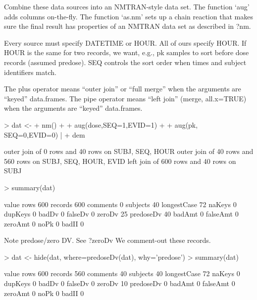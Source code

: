 Combine these data sources into an NMTRAN-style data set.
The function `aug' adds columns on-the-fly.
The function `as.nm' sets up a chain reaction that makes sure the
final result has properties of an NMTRAN data set as described in ?nm.

Every source must specify DATETIME or HOUR.  All of ours specify HOUR.
If HOUR is the same for two records, we want, e.g., pk samples to sort 
before dose records (assumed predose).  SEQ controls the sort order 
when times and subject identifiers match.

The plus operator means ``outer join'' or ``full merge'' when the arguments are ``keyed'' data.frames.
The pipe operator means ``left join'' (merge, all.x=TRUE) when the arguments are ``keyed'' data.frames.
\begin{Schunk}
\begin{Sinput}
> dat <- 
+ 	nm() + 
+ 	aug(dose,SEQ=1,EVID=1) + 
+ 	aug(pk,  SEQ=0,EVID=0) | 
+ 	dem
\end{Sinput}
\begin{Soutput}
outer join of 0 rows and 40 rows on SUBJ, SEQ, HOUR
outer join of 40 rows and 560 rows on SUBJ, SEQ, HOUR, EVID
left join of 600 rows and 40 rows on SUBJ
\end{Soutput}
\begin{Sinput}
> summary(dat)
\end{Sinput}
\begin{Soutput}
            value
rows          600
records       600
comments        0
subjects       40
longestCase    72
naKeys          0
dupKeys         0
badDv           0
falseDv         0
zeroDv         25
predoseDv      40
badAmt          0
falseAmt        0
zeroAmt         0
noPk            0
badII           0
\end{Soutput}
\end{Schunk}
Note predose/zero DV.
See ?zeroDv
We comment-out these records.
\begin{Schunk}
\begin{Sinput}
> dat <- hide(dat, where=predoseDv(dat), why='predose')
> summary(dat)
\end{Sinput}
\begin{Soutput}
            value
rows          600
records       560
comments       40
subjects       40
longestCase    72
naKeys          0
dupKeys         0
badDv           0
falseDv         0
zeroDv         10
predoseDv       0
badAmt          0
falseAmt        0
zeroAmt         0
noPk            0
badII           0
\end{Soutput}
\end{Schunk}
